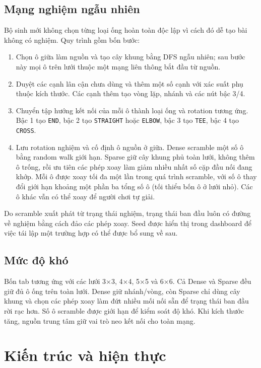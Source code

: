 \documentclass[12pt,a4paper]{article}
\newcommand{\code}[1]{\texttt{#1}}
\begin{document}
\subsection{Mạng nghiệm ngẫu nhiên}
Bộ sinh mới không chọn từng loại ống hoàn toàn độc lập vì cách đó dễ tạo bài không có nghiệm. Quy trình gồm bốn bước:
\begin{enumerate}[label=\arabic*.]
  \item Chọn ô giữa làm nguồn và tạo cây khung bằng DFS ngẫu nhiên; sau bước này mọi ô trên lưới thuộc một mạng liên thông bắt đầu từ nguồn.
  \item Duyệt các cạnh lân cận chưa dùng và thêm một số cạnh với xác suất phụ thuộc kích thước. Các cạnh thêm tạo vòng lặp, nhánh và các nút bậc 3/4.
  \item Chuyển tập hướng kết nối của mỗi ô thành loại ống và rotation tương ứng. Bậc 1 tạo \code{END}, bậc 2 tạo \code{STRAIGHT} hoặc \code{ELBOW}, bậc 3 tạo \code{TEE}, bậc 4 tạo \code{CROSS}.
  \item Lưu rotation nghiệm và cố định ô nguồn ở giữa. Dense scramble một số ô bằng random walk giới hạn. Sparse giữ cây khung phủ toàn lưới, không thêm ô trống, rồi ưu tiên các phép xoay làm giảm nhiều nhất số cặp đầu nối đang khớp. Mỗi ô được xoay tối đa một lần trong quá trình scramble, với số ô thay đổi giới hạn khoảng một phần ba tổng số ô (tối thiểu bốn ô ở lưới nhỏ). Các ô khác vẫn có thể xoay để người chơi tự giải.
\end{enumerate}

Do scramble xuất phát từ trạng thái nghiệm, trạng thái ban đầu luôn có đường về nghiệm bằng cách đảo các phép xoay. Seed được hiển thị trong dashboard để việc tái lập một trường hợp có thể được bổ sung về sau.

\subsection{Mức độ khó}
Bốn tab tương ứng với các lưới 3\(\times\)3, 4\(\times\)4, 5\(\times\)5 và 6\(\times\)6. Cả Dense và Sparse đều giữ đủ ô ống trên toàn lưới. Dense giữ nhánh/vòng, còn Sparse chỉ dùng cây khung và chọn các phép xoay làm đứt nhiều mối nối sẵn để trạng thái ban đầu rời rạc hơn. Số ô scramble được giới hạn để kiểm soát độ khó. Khi kích thước tăng, nguồn trung tâm giữ vai trò neo kết nối cho toàn mạng.

\section{Kiến trúc và hiện thực}
\end{document}

